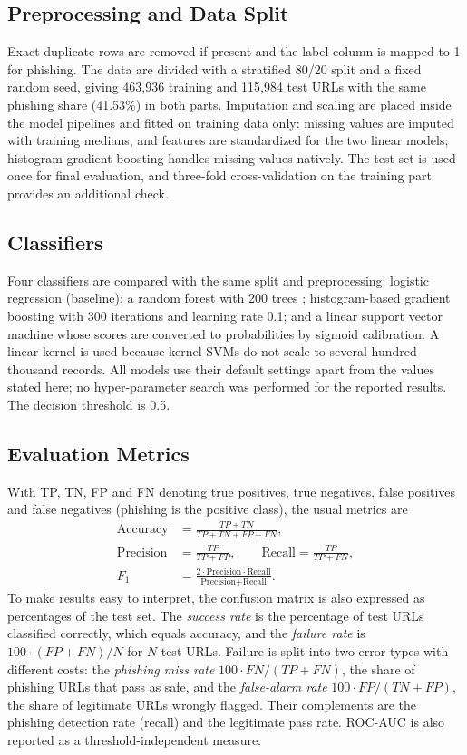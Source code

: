 \documentclass[journal]{IEEEtran}
\begin{document}
\subsection{Preprocessing and Data Split}
Exact duplicate rows are removed if present and the label column is mapped to 1 for phishing. The data are divided with a stratified 80/20 split and a fixed random seed, giving 463,936 training and 115,984 test URLs with the same phishing share (41.53\%) in both parts. Imputation and scaling are placed inside the model pipelines and fitted on training data only: missing values are imputed with training medians, and features are standardized for the two linear models; histogram gradient boosting handles missing values natively. The test set is used once for final evaluation, and three-fold cross-validation on the training part provides an additional check.

\subsection{Classifiers}
Four classifiers are compared with the same split and preprocessing: logistic regression (baseline); a random forest with 200 trees \cite{breiman2001random}; histogram-based gradient boosting with 300 iterations and learning rate 0.1; and a linear support vector machine whose scores are converted to probabilities by sigmoid calibration. A linear kernel is used because kernel SVMs do not scale to several hundred thousand records. All models use their default settings apart from the values stated here; no hyper-parameter search was performed for the reported results. The decision threshold is 0.5.

\subsection{Evaluation Metrics}
With TP, TN, FP and FN denoting true positives, true negatives, false positives and false negatives (phishing is the positive class), the usual metrics are
\begin{align}
\text{Accuracy} &= \frac{TP+TN}{TP+TN+FP+FN},\\
\text{Precision} &= \frac{TP}{TP+FP},\qquad
\text{Recall} = \frac{TP}{TP+FN},\\
F_1 &= \frac{2\cdot\text{Precision}\cdot\text{Recall}}{\text{Precision}+\text{Recall}}.
\end{align}
To make results easy to interpret, the confusion matrix is also expressed as percentages of the test set. The \emph{success rate} is the percentage of test URLs classified correctly, which equals accuracy, and the \emph{failure rate} is $100\cdot(FP+FN)/N$ for $N$ test URLs. Failure is split into two error types with different costs: the \emph{phishing miss rate} $100\cdot FN/(TP+FN)$, the share of phishing URLs that pass as safe, and the \emph{false-alarm rate} $100\cdot FP/(TN+FP)$, the share of legitimate URLs wrongly flagged. Their complements are the phishing detection rate (recall) and the legitimate pass rate. ROC-AUC is also reported as a threshold-independent measure.
\end{document}

